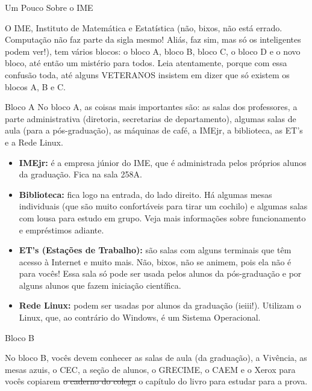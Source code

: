\begin{secao}{Um Pouco Sobre o IME}

O IME, Instituto de Matemática e Estatística (não, bixos, não está errado.
Computação não faz parte da sigla mesmo! Aliás, faz sim, mas só os inteligentes
podem ver!), tem vários blocos: o bloco A, bloco B, bloco C, o bloco D e o
novo bloco, até então um mistério para todos. Leia atentamente, porque com essa
confusão toda, até alguns VETERANOS insistem em dizer que só existem os blocos
A, B e C.


\begin{subsecao}{Bloco A}
No bloco A, as coisas mais importantes são: as salas dos professores, a parte
administrativa (diretoria, secretarias de departamento), algumas salas de aula
(para a pós-graduação), as máquinas de café, a IMEjr, a biblioteca, as ET's e
a Rede Linux.

\begin{itemize}

\item {\bf IMEjr:} é a empresa júnior do IME, que é administrada pelos próprios
alunos da graduação. Fica na sala 258A.

\item {\bf Biblioteca:} fica logo na entrada, do lado direito. Há algumas mesas
individuais (que são muito confortáveis para tirar um cochilo) e algumas salas
com lousa para estudo em grupo. Veja mais informações sobre funcionamento e
empréstimos adiante.

\item {\bf ET's (Estações de Trabalho):} são salas com alguns terminais que têm
acesso à Internet e muito mais. Não, bixos, não se animem, pois ela não é para
vocês! Essa sala só pode ser usada pelos alunos da pós-graduação e por alguns
alunos que fazem iniciação científica.

\item {\bf Rede Linux:} podem ser usadas por alunos da graduação (ieiii!).
Utilizam o Linux, que, ao contrário do Windows, é um Sistema Operacional.

\end{itemize}


\end{subsecao}

\begin{subsecao}{Bloco B}


No bloco B, vocês devem conhecer as salas de aula (da graduação), a Vivência, as
mesas azuis, o CEC, a seção de alunos, o GRECIME, o CAEM e o Xerox para vocês
copiarem \sout{o caderno do colega} o capítulo do livro para estudar para a prova.


\end{subsecao}
\end{secao}
